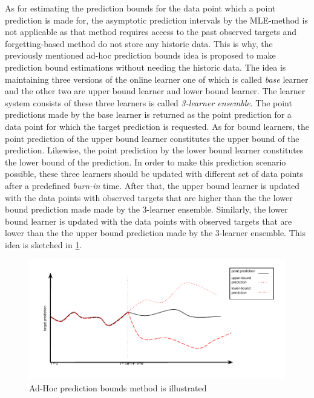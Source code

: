 As for estimating the prediction bounds for the data point which a point prediction is made for, the asymptotic prediction intervals by the MLE-method is not applicable as that method requires access to the past observed targets and forgetting-based method do not store any historic data. This is why, the previously mentioned ad-hoc prediction bounds idea is proposed to make prediction bound estimations without needing the historic data. The idea is maintaining three versions of the online learner one of which is called \textit{base} learner and the other two are upper bound learner and lower bound learner. The learner system consists of these three learners is called \textit{3-learner ensemble}. The point predictions made by the base learner is returned as the point prediction for a data point for which the target prediction is requested. As for bound learners, the point prediction of the upper bound learner constitutes the upper bound of the prediction. Likewise, the point prediction by the lower bound learner constitutes the lower bound of the prediction. In order to make this prediction scenario possible, these three learners should be updated with different set of data points after a predefined \textit{burn-in} time. After that, the upper bound learner is updated with the data points with observed targets that are higher than the the lower bound prediction made made by the 3-learner ensemble. Similarly, the lower bound learner is updated with the data points with observed targets that are lower than the the upper bound prediction made by the 3-learner ensemble. This idea is sketched in \ref{fig:ad-hoc_prediction_bounds}.

\begin{figure}[htbp]
  \centering
    \includegraphics[width=\linewidth]{./Figures/ad-hoc_prediction_bounds.pdf}
  \caption{Ad-Hoc prediction bounds method is illustrated}
  \label{fig:ad-hoc_prediction_bounds}
\end{figure}

